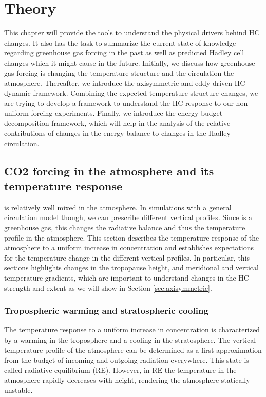\chapter{Theory}
\label{chapter:theory}

This chapter will provide the tools to understand the physical drivers behind HC changes. It also has the task to summarize the current state of knowledge regarding greenhouse gas forcing in the past as well as predicted Hadley cell changes which it might cause in the future. Initially, we discuss how greenhouse gas forcing is changing the temperature structure and the circulation the atmosphere. Thereafter, we introduce the axisymmetric and eddy-driven HC dynamic framework. Combining the expected temperature structure changes, we are trying to develop a framework to understand the HC response to our non-uniform \CO forcing experiments. Finally, we introduce the energy budget decomposition framework, which will help in the analysis of the relative contributions of changes in the energy balance to changes in the Hadley circulation. 
\section{CO2 forcing in the atmosphere and its temperature response} \label{sec:CO2_T_response}
\CO{} is relatively well mixed in the atmosphere. In simulations with a general circulation model though, we can prescribe different vertical \CO{} profiles. Since \CO{} is a greenhouse gas, this changes the radiative balance and thus the temperature profile in the atmosphere. This section describes the temperature response of the atmosphere to a uniform increase in \CO{} concentration and establishes expectations for the temperature change in the different vertical \CO{} profiles. In particular, this sections highlights changes in the tropopause height, and meridional and vertical temperature gradients, which are important to understand changes in the HC strength and extent as we will show in Section \ref{sec:axisymmetric}.
\subsection{Tropospheric warming and stratospheric cooling} \label{subsec:theo_warming_cooling}
The temperature response to a uniform increase in \CO{} concentration is characterized by a warming in the troposphere and a cooling in the stratosphere. The vertical temperature profile of the atmosphere can be determined as a first approximation from the budget of incoming and outgoing radiation everywhere. This state is called radiative equilibrium (RE). However, in RE the temperature in the atmosphere rapidly decreases with height, rendering the atmosphere statically unstable.

